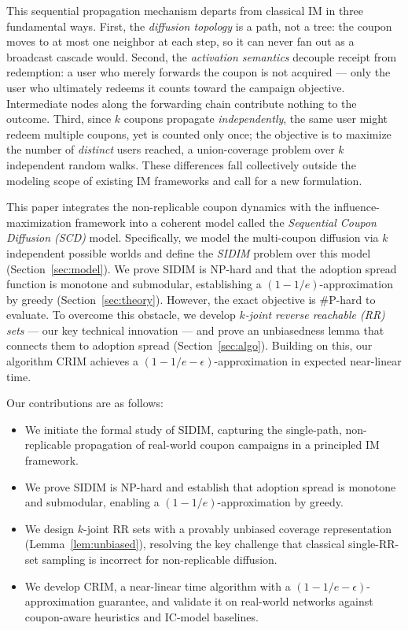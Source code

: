 \documentclass[sigconf]{acmart}
\newcommand{\CRIM}{\textsc{CRIM}}
\begin{document}
This sequential propagation mechanism departs from classical IM in three
fundamental ways.
First, the \emph{diffusion topology} is a path, not a tree: the coupon
moves to at most one neighbor at each step, so it can never fan out as a
broadcast cascade would.
Second, the \emph{activation semantics} decouple receipt from
redemption: a user who merely forwards the coupon is not acquired — only
the user who ultimately redeems it counts toward the campaign objective.
Intermediate nodes along the forwarding chain contribute nothing to the
outcome.
Third, since $k$ coupons propagate \emph{independently}, the same user
might redeem multiple coupons, yet is counted only once; the objective
is to maximize the number of \emph{distinct} users reached, a
union-coverage problem over $k$ independent random walks.
These differences fall collectively outside the modeling scope of
existing IM frameworks and call for a new formulation.

This paper integrates the non-replicable coupon dynamics with the
influence-maximization framework into a coherent model called the
\emph{Sequential Coupon Diffusion (SCD)} model.
Specifically, we model the multi-coupon diffusion via $k$ independent
possible worlds and define the \emph{SIDIM} problem over this model
(Section~\ref{sec:model}).
We prove SIDIM is NP-hard and that the adoption spread function is
monotone and submodular, establishing a $(1{-}1/e)$-approximation by
greedy (Section~\ref{sec:theory}).  However, the exact objective is
\#P-hard to evaluate.  To overcome this obstacle, we develop \emph{$k$-joint
reverse reachable (RR) sets} — our key technical innovation — and prove
an unbiasedness lemma that connects them to adoption spread
(Section~\ref{sec:algo}).  Building on this, our algorithm \CRIM{}
achieves a $(1{-}1/e{-}\epsilon)$-approximation in expected near-linear time.

Our contributions are as follows:
\begin{itemize}[leftmargin=*]
  \item We initiate the formal study of SIDIM, capturing the
    single-path, non-replicable propagation of real-world coupon
    campaigns in a principled IM framework.
  \item We prove SIDIM is NP-hard and establish that adoption spread is
    monotone and submodular, enabling a $(1{-}1/e)$-approximation by
    greedy.
  \item We design $k$-joint RR sets with a provably unbiased coverage
    representation (Lemma~\ref{lem:unbiased}), resolving the key
    challenge that classical single-RR-set sampling is incorrect for
    non-replicable diffusion.
  \item We develop \CRIM{}, a near-linear time algorithm with a
    $(1{-}1/e{-}\epsilon)$-approximation guarantee, and validate it on
    real-world networks against coupon-aware heuristics and
    IC-model baselines.
\end{itemize}
\end{document}
